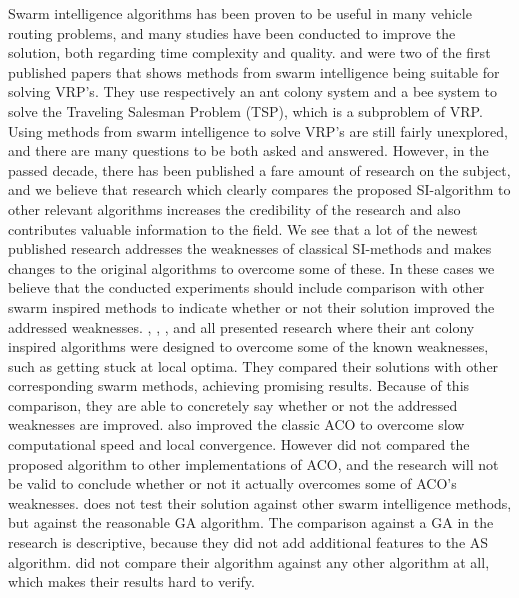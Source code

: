 Swarm intelligence algorithms has been proven to be useful in many vehicle routing problems, and many studies have been conducted to improve the solution, both regarding time complexity and quality. \citet{dorigo97} and \citet{lucic03} were two of the first published papers that shows methods from swarm intelligence being suitable for solving VRP's. They use respectively an ant colony system and a bee system to solve the Traveling Salesman Problem (TSP), which is a subproblem of VRP. Using methods from swarm intelligence to solve VRP's are still fairly unexplored, and there are many questions to be both asked and answered. However, in the passed decade, there has been published a fare amount of research on the subject, and we believe that research which clearly compares the proposed SI-algorithm to other relevant algorithms increases the credibility of the research and also contributes valuable information to the field. We see that a lot of the newest published research addresses the weaknesses of classical SI-methods and makes changes to the original algorithms to overcome some of these. In these cases we believe that the conducted experiments should include comparison with other swarm inspired methods to indicate whether or not their solution improved the addressed weaknesses. \citet{tripathi09}, \citet{yang07}, \citet{salehinejad10}, and \citet{jiang10} all presented research where their ant colony inspired algorithms were designed to overcome some of the known weaknesses, such as getting stuck at local optima. They compared their solutions with other corresponding swarm methods, achieving promising results. Because of this comparison, they are able to concretely say whether or not the addressed weaknesses are improved. \citet{sedighpour14} also improved the classic ACO to overcome slow computational speed and local convergence. However \citet{sedighpour14} did not compared the proposed algorithm to other implementations of ACO, and the research will not be valid to conclude whether or not it actually overcomes some of ACO's weaknesses. \citet{poorzahedy11} does not test their solution against other swarm intelligence methods, but against the reasonable GA algorithm. The comparison against a GA in the research is descriptive, because they did not add additional features to the AS algorithm. \citet{salehi-nezhad07} did not compare their algorithm against any other algorithm at all, which makes their results hard to verify. 

